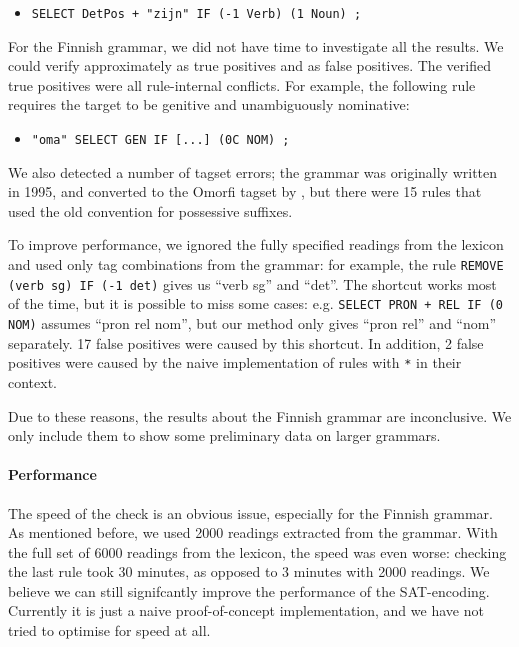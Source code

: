 \begin{itemize}
\item[] \texttt{SELECT DetPos + "zijn" IF (-1 Verb) (1 Noun) ;}
\end{itemize}


For the Finnish grammar, we did not have time to investigate all the
results. We could verify approximately  as true positives and
 as false positives.
The verified true positives were all rule-internal conflicts. 
For example, the following rule requires the target to be genitive and unambiguously nominative: 
\begin{itemize}
\item[]\texttt{"oma" SELECT GEN IF [...] (0C NOM) ;}
\end{itemize}
We also detected a number of tagset errors;
the grammar was originally written in 1995, and converted to the
Omorfi tagset by \cite{pirinen2015}, but there were 15 rules that used the old convention for possessive suffixes.

To improve performance, we ignored the fully specified readings from the
lexicon and used only tag combinations from the grammar:
for example, the rule \texttt{REMOVE (verb sg) IF (-1 det)}
gives us ``verb sg'' and ``det''.
The shortcut works most of the time, but it is possible to
miss some cases: e.g. \texttt{SELECT PRON + REL IF (0 NOM)} 
assumes ``pron rel nom'', but our method only gives
``pron rel'' and ``nom'' separately. 
17 false positives were caused by this shortcut. 
In addition, 2 false positives were caused by the naive implementation of
rules with \verb!*! in their context.

Due to these reasons, the results about the Finnish grammar are
inconclusive. We only include them to show some preliminary data on larger grammars.

\paragraph{Performance} The speed of the check is an obvious issue,
especially for the Finnish grammar. 
As mentioned before, we used 2000 readings extracted from the grammar.
With the full set of 6000 readings from the lexicon, the speed
was even worse: checking the last rule took 30 minutes, as opposed to
3 minutes with 2000 readings. 
We believe we can still signifcantly improve the performance of the SAT-encoding. Currently it is just a naive proof-of-concept implementation, and we have not tried to optimise for speed at all.

